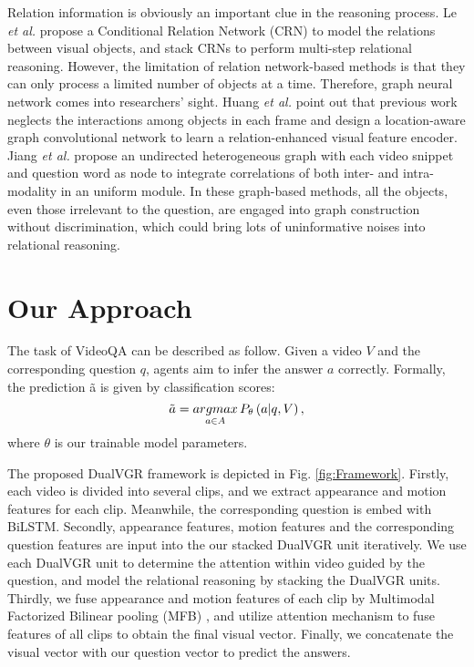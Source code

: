 \documentclass[journal]{IEEEtran}
\begin{document}
Relation information is obviously an important clue in the reasoning process. Le \textit{et al.} \cite{le2020hierarchical} propose a Conditional Relation Network (CRN) to model the relations between visual objects, and stack CRNs to perform multi-step relational reasoning. However, the limitation of relation network-based methods is that they can only process a limited number of objects at a time. Therefore, graph neural network comes into researchers' sight. Huang \textit{et al.} \cite{huang2020location} point out that previous work neglects the interactions among objects in each frame and design a location-aware graph convolutional network to learn a relation-enhanced visual feature encoder. Jiang \textit{et al.} \cite{jiang2020reasoning} propose an undirected heterogeneous graph with each video snippet and question word as node to integrate correlations of both inter- and intra-modality in an uniform module. In these graph-based methods, all the objects, even those irrelevant to the question, are engaged into graph construction without discrimination, which could bring lots of uninformative noises into relational reasoning.  

\section{Our Approach}
The task of VideoQA can be described as follow. Given a video $V$ and the corresponding question $q$, agents aim to infer the answer $a$ correctly. Formally, the prediction \~{a} is given by classification scores:
\begin{equation}
    \Tilde{a} = \mathop{argmax}\limits_{a \in A}P_\theta\left(a | q,V\right),
\end{equation}
where $\theta$ is our trainable model parameters. 

The proposed DualVGR framework is depicted in Fig. \ref{fig:Framework}. Firstly, each video is divided into several clips, and we extract appearance and motion features for each clip. Meanwhile, the corresponding question is embed with BiLSTM. Secondly, appearance features, motion features and the corresponding question features are input into the our stacked DualVGR unit iteratively. We use each DualVGR unit to determine the attention within video guided by the question, and model the relational reasoning by stacking the DualVGR units. Thirdly, we fuse appearance and motion features of each clip by Multimodal Factorized Bilinear pooling (MFB) \cite{yu2017multi}, and utilize attention mechanism to fuse features of all clips to obtain the final visual vector. Finally, we concatenate the visual vector with our question vector to predict the answers.
\end{document}
